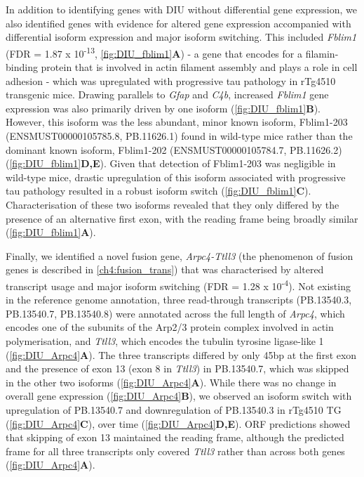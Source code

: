 In addition to identifying genes with DIU without differential gene expression, we also identified genes with evidence for altered gene expression accompanied with differential isoform expression and major isoform switching. This included \textit{Fblim1} (FDR = 1.87 x 10\textsuperscript{-13}, \cref{fig:DIU_fblim1}\textbf{A}) - a gene that encodes for a filamin-binding protein that is involved in actin filament assembly and plays a role in cell adhesion\cite{Takafuta2003} - which was upregulated with progressive tau pathology in rTg4510 transgenic mice. Drawing parallels to \textit{Gfap} and \textit{C4b}, increased \textit{Fblim1} gene expression was also primarily driven by one isoform (\cref{fig:DIU_fblim1}\textbf{B}). However, this isoform was the less abundant, minor known isoform, Fblim1-203 (ENSMUST00000105785.8, PB.11626.1) found in wild-type mice rather than the dominant known isoform, Fblim1-202 (ENSMUST00000105784.7, PB.11626.2) (\cref{fig:DIU_fblim1}\textbf{D,E}). Given that detection of Fblim1-203 was negligible in wild-type mice, drastic upregulation of this isoform associated with progressive tau pathology resulted in a robust isoform switch (\cref{fig:DIU_fblim1}\textbf{C}). Characterisation of these two isoforms revealed that they only differed by the presence of an alternative first exon, with the reading frame being broadly similar (\cref{fig:DIU_fblim1}\textbf{A}). 

Finally, we identified a novel fusion gene, \textit{Arpc4-Ttll3} (the phenomenon of fusion genes is described in \cref{ch4:fusion_trans}) that was characterised by altered transcript usage and major isoform switching (FDR = 1.28 x 10\textsuperscript{-4}). Not existing in the reference genome annotation, three read-through transcripts (PB.13540.3, PB.13540.7, PB.13540.8) were annotated across the full length of \textit{Arpc4}, which encodes one of the subunits of the Arp2/3 protein complex involved in actin polymerisation, and \textit{Ttll3}, which encodes the tubulin tyrosine ligase-like 1 (\cref{fig:DIU_Arpc4}\textbf{A}). The three transcripts differed by only 45bp at the first exon and the presence of exon 13 (exon 8 in \textit{Ttll3}) in PB.13540.7, which was skipped in the other two isoforms (\cref{fig:DIU_Arpc4}\textbf{A}). While there was no change in overall gene expression (\cref{fig:DIU_Arpc4}\textbf{B}), we observed an isoform switch with upregulation of PB.13540.7 and downregulation of PB.13540.3 in rTg4510 TG (\cref{fig:DIU_Arpc4}\textbf{C}), over time (\cref{fig:DIU_Arpc4}\textbf{D,E}). ORF predictions showed that skipping of exon 13 maintained the reading frame, although the predicted frame for all three transcripts only covered \textit{Ttll3} rather than across both genes (\cref{fig:DIU_Arpc4}\textbf{A}).  

